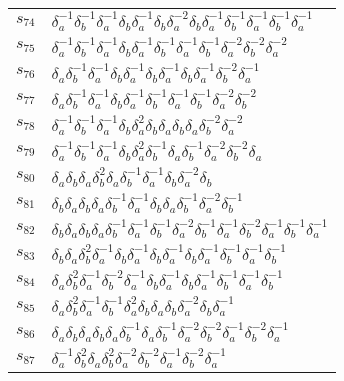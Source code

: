 \documentclass{article}
\begin{document}
\begin{center}
\begin{tabular}{ll}
$s_{74}$ & $\delta_a^{-1}\delta_b^{-1}\delta_a^{-1}\delta_b^{}\delta_a^{-1}\delta_b^{}\delta_a^{-2}\delta_b^{}\delta_a^{-1}\delta_b^{-1}\delta_a^{-1}\delta_b^{-1}\delta_a^{-1}$ \\
$s_{75}$ & $\delta_a^{-1}\delta_b^{-1}\delta_a^{-1}\delta_b^{}\delta_a^{-1}\delta_b^{-1}\delta_a^{-1}\delta_b^{-1}\delta_a^{-2}\delta_b^{-2}\delta_a^{-2}$ \\
$s_{76}$ & $\delta_a^{}\delta_b^{-1}\delta_a^{-1}\delta_b^{}\delta_a^{-1}\delta_b^{}\delta_a^{-1}\delta_b^{}\delta_a^{-1}\delta_b^{-2}\delta_a^{-1}$ \\
$s_{77}$ & $\delta_a^{}\delta_b^{-1}\delta_a^{-1}\delta_b^{}\delta_a^{-1}\delta_b^{-1}\delta_a^{-1}\delta_b^{-1}\delta_a^{-2}\delta_b^{-2}$ \\
$s_{78}$ & $\delta_a^{-1}\delta_b^{-1}\delta_a^{-1}\delta_b^{}\delta_a^{2}\delta_b^{}\delta_a^{}\delta_b^{}\delta_a^{}\delta_b^{-2}\delta_a^{-2}$ \\
$s_{79}$ & $\delta_a^{-1}\delta_b^{-1}\delta_a^{-1}\delta_b^{}\delta_a^{2}\delta_b^{-1}\delta_a^{}\delta_b^{-1}\delta_a^{-2}\delta_b^{-2}\delta_a^{}$ \\
$s_{80}$ & $\delta_a^{}\delta_b^{}\delta_a^{}\delta_b^{2}\delta_a^{}\delta_b^{-1}\delta_a^{-1}\delta_b^{}\delta_a^{-2}\delta_b^{}$ \\
$s_{81}$ & $\delta_b^{}\delta_a^{}\delta_b^{}\delta_a^{}\delta_b^{-1}\delta_a^{-1}\delta_b^{}\delta_a^{}\delta_b^{-1}\delta_a^{-2}\delta_b^{-1}$ \\
$s_{82}$ & $\delta_b^{}\delta_a^{}\delta_b^{}\delta_a^{}\delta_b^{-1}\delta_a^{-1}\delta_b^{-1}\delta_a^{-2}\delta_b^{-1}\delta_a^{-1}\delta_b^{-2}\delta_a^{-1}\delta_b^{-1}\delta_a^{-1}$ \\
$s_{83}$ & $\delta_b^{}\delta_a^{}\delta_b^{2}\delta_a^{-1}\delta_b^{}\delta_a^{-1}\delta_b^{}\delta_a^{-1}\delta_b^{}\delta_a^{-1}\delta_b^{-1}\delta_a^{-1}\delta_b^{-1}$ \\
$s_{84}$ & $\delta_a^{}\delta_b^{2}\delta_a^{-1}\delta_b^{-2}\delta_a^{-1}\delta_b^{}\delta_a^{-1}\delta_b^{}\delta_a^{-1}\delta_b^{-1}\delta_a^{-1}\delta_b^{-1}$ \\
$s_{85}$ & $\delta_a^{}\delta_b^{2}\delta_a^{-1}\delta_b^{-1}\delta_a^{2}\delta_b^{}\delta_a^{}\delta_b^{}\delta_a^{-2}\delta_b^{}\delta_a^{-1}$ \\
$s_{86}$ & $\delta_a^{}\delta_b^{}\delta_a^{}\delta_b^{}\delta_a^{}\delta_b^{-1}\delta_a^{}\delta_b^{-1}\delta_a^{-2}\delta_b^{-2}\delta_a^{-1}\delta_b^{-2}\delta_a^{-1}$ \\
$s_{87}$ & $\delta_a^{-1}\delta_b^{2}\delta_a^{}\delta_b^{2}\delta_a^{-2}\delta_b^{-2}\delta_a^{-1}\delta_b^{-2}\delta_a^{-1}$ \\

\end{tabular}
\end{center}
\end{document}
